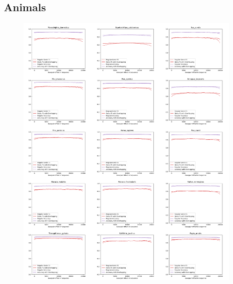\documentclass{article}
\begin{document}
\subsection{Animals}
\newpage
\def \overlapscale{1.07}
\begin{figure}[!h]
\centerline{\includegraphics[width=\overlapscale\textwidth]{images/overlapping/montage_animals1}}
\end{figure}
\end{document}
